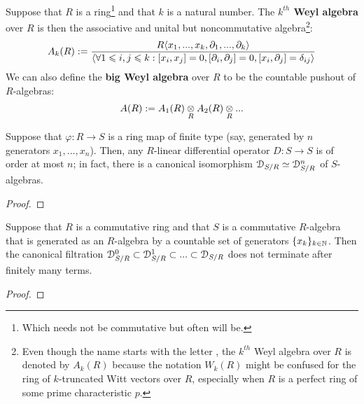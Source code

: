             \begin{definition} \label{def: weyl_algebras}
                Suppose that $R$ is a ring\footnote{Which needs not be commutative but often will be.} and that $k$ is a natural number. The \textbf{$k^{th}$ Weyl algebra} over $R$ is then the associative and unital but noncommutative algebra\footnote{Even though the name  starts with the letter , the $k^{th}$ Weyl algebra over $R$ is denoted by $A_k(R)$ because the notation $W_k(R)$ might be confused for the ring of $k$-truncated Witt vectors over $R$, especially when $R$ is a perfect ring of some prime characteristic $p$.}:
                    $$A_k(R) := \frac{R\langle x_1, ..., x_k, \partial_1, ..., \partial_k\rangle}{\langle\forall 1 \leqslant i, j \leqslant k: [x_i, x_j] = 0, [\partial_i, \partial_j] = 0, [x_i, \partial_j] = \delta_{ij}\rangle}$$
                We can also define the \textbf{big Weyl algebra} over $R$ to be the countable pushout of $R$-algebras:
                    $$A(R) := A_1(R) \tensor_R A_2(R) \tensor_R ...$$
            \end{definition}
            \begin{lemma} \label{lemma: differential_operators_on_finite_type_algebras}
                Suppose that $\varphi: R \to S$ is a ring map of finite type (say, generated by $n$ generators $x_1, ..., x_n$). Then, any $R$-linear differential operator $D: S \to S$ is of order at most $n$; in fact, there is a canonical isomorphism $\mathcal{D}_{S/R} \simeq \mathcal{D}_{S/R}^n$ of $S$-algebras.
            \end{lemma}
                \begin{proof}
                    
                \end{proof}
            \begin{lemma} \label{lemma: differential_operators_on_infinite_type_algebras}
                Suppose that $R$ is a commutative ring and that $S$ is a commutative $R$-algebra that is generated as an $R$-algebra by a countable set of generators $\{x_k\}_{k \in \mathbb{N}}$. Then the canonical filtration $\mathcal{D}_{S/R}^0 \subset \mathcal{D}_{S/R}^1 \subset ... \subset \mathcal{D}_{S/R}$ does not terminate after finitely many terms.
            \end{lemma}
                \begin{proof}
                    
                \end{proof}

